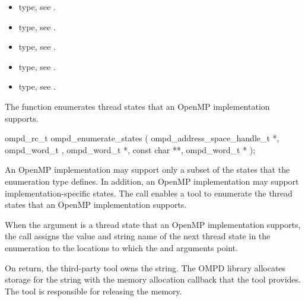 \crossreferences
\begin{itemize}
\item {} type, see .

\item {} type, see .

\item {} type, see .

\item {} type, see .

\item {} type, see .
\end{itemize}



\label{subsubsubsec:ompd_enumerate_states}

\summary
The  function enumerates thread states 
that an OpenMP implementation supports.

\format
\begin{cspecific}
\begin{ompSyntax}
ompd_rc_t ompd_enumerate_states (
  ompd_address_space_handle_t *,
  ompd_word_t ,
  ompd_word_t *,
  const char **,
  ompd_word_t *
);
\end{ompSyntax}
\end{cspecific}

\descr
An OpenMP implementation may support only a subset of the states that 
the  enumeration type defines. In addition, an
OpenMP implementation may support implementation-specific states.
The  call enables a tool to enumerate 
the thread states that an OpenMP implementation supports.

When the  argument is a thread state that an OpenMP 
implementation supports, the call assigns the value and string name of 
the next thread state in the enumeration to the locations to which the 
 and  arguments point.

On return, the third-party tool owns the  string.
The OMPD library allocates storage for the string with the memory allocation 
callback that the tool provides. The tool is responsible for releasing the memory.

